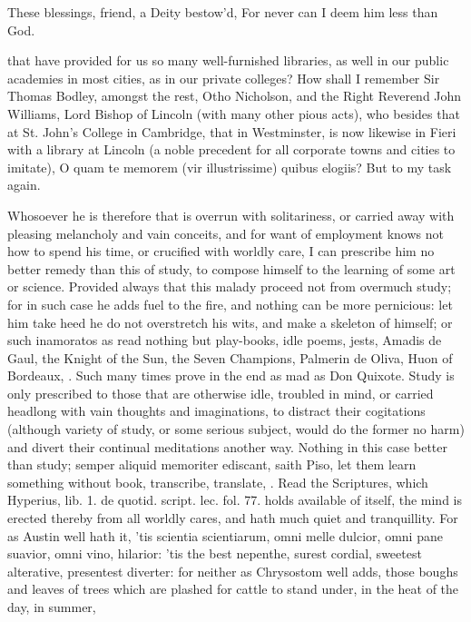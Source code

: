 {These blessings, friend, a Deity bestow'd,
For never can I deem him less than God.

that have provided for us so many well-furnished libraries, as well in
our public academies in most cities, as in our private colleges? How
shall I remember Sir Thomas Bodley, amongst the rest, Otho
Nicholson, and the Right Reverend John Williams, Lord Bishop of Lincoln
(with many other pious acts), who besides that at St. John's College in
Cambridge, that in Westminster, is now likewise in Fieri with a library
at Lincoln (a noble precedent for all corporate towns and cities to
imitate), O quam te memorem (vir illustrissime) quibus elogiis? But to
my task again.

Whosoever he is therefore that is overrun with solitariness, or carried
away with pleasing melancholy and vain conceits, and for want of
employment knows not how to spend his time, or crucified with worldly
care, I can prescribe him no better remedy than this of study, to
compose himself to the learning of some art or science. Provided always
that this malady proceed not from overmuch study; for in such case he
adds fuel to the fire, and nothing can be more pernicious: let him take
heed he do not overstretch his wits, and make a skeleton of himself; or
such inamoratos as read nothing but play-books, idle poems, jests,
Amadis de Gaul, the Knight of the Sun, the Seven Champions, Palmerin de
Oliva, Huon of Bordeaux, \etc{}. Such many times prove in the end as mad as
Don Quixote. Study is only prescribed to those that are otherwise idle,
troubled in mind, or carried headlong with vain thoughts and
imaginations, to distract their cogitations (although variety of study,
or some serious subject, would do the former no harm) and divert their
continual meditations another way. Nothing in this case better than
study; semper aliquid memoriter ediscant, saith Piso, let them learn
something without book, transcribe, translate, \etc{}. Read the Scriptures,
which Hyperius, lib. 1. de quotid. script. lec. fol. 77. holds
available of itself, the mind is erected thereby from all worldly
cares, and hath much quiet and tranquillity. For as Austin well
hath it, 'tis scientia scientiarum, omni melle dulcior, omni pane
suavior, omni vino, hilarior: 'tis the best nepenthe, surest cordial,
sweetest alterative, presentest diverter: for neither as
Chrysostom well adds, those boughs and leaves of trees which are
plashed for cattle to stand under, in the heat of the day, in summer,
}
